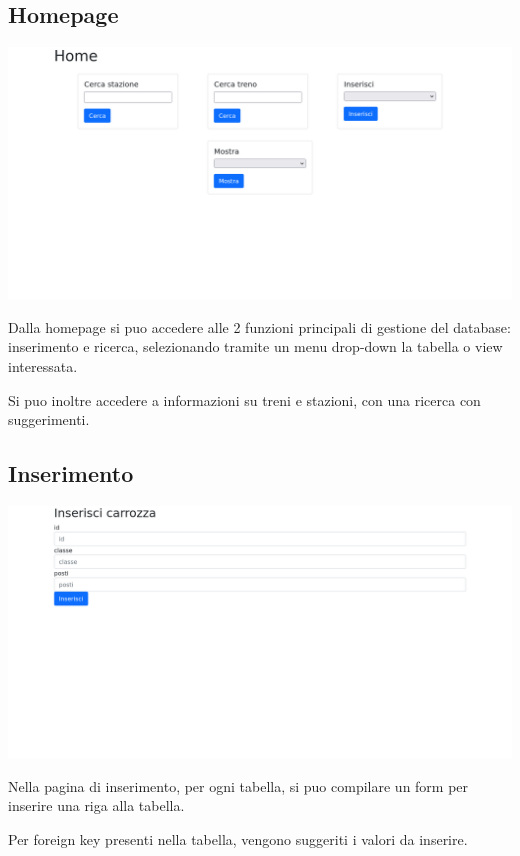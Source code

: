 \documentclass[a4paper,12pt]{report}
\begin{document}
	\subsection{Homepage}
	\includegraphics[width=\linewidth]{res/screenshots/home.png}
	\par Dalla homepage si puo accedere alle 2 funzioni principali di gestione del database: inserimento e ricerca,
	selezionando tramite un menu drop-down la tabella o view interessata.
	\par Si puo inoltre accedere a informazioni su treni e stazioni, con una ricerca con suggerimenti.
	\subsection{Inserimento}
	\includegraphics[width=\linewidth]{res/screenshots/inserisci.png}
	\par Nella pagina di inserimento, per ogni tabella, si puo compilare un form per inserire una riga alla tabella.
	\par Per foreign key presenti nella tabella, vengono suggeriti i valori da inserire.
\end{document}
